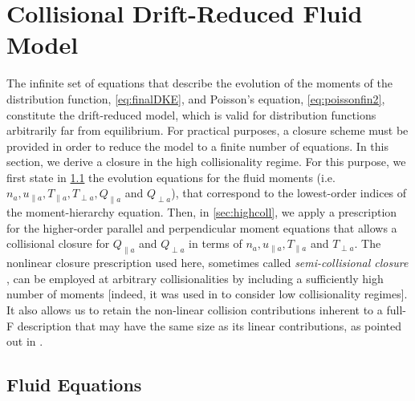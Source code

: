 {{\section{Collisional Drift-Reduced Fluid Model}
\label{sec:fluidmodel}

The infinite set of equations that describe the evolution of the moments of the distribution function, \cref{eq:finalDKE}, and Poisson's equation, \cref{eq:poissonfin2}, constitute the drift-reduced model, which is valid for distribution functions arbitrarily far from equilibrium. For practical purposes, a closure scheme must be provided in order to reduce the model to a finite number of equations.
In this section, we derive a closure in the high collisionality regime. For this purpose, we first state in \cref{sec:fluideqs} the evolution equations for the fluid moments (i.e. $n_a, u_{\parallel a}, T_{\parallel a}, T_{\perp a}, Q_{\parallel a}$ and $Q_{\perp a}$), that correspond to the lowest-order indices of the moment-hierarchy equation. Then, in \cref{sec:highcoll}, we apply a prescription for the higher-order parallel and perpendicular moment equations that allows a collisional closure for $Q_{\parallel a}$ and $Q_{\perp a}$ in terms of $n_a, u_{\parallel a}, T_{\parallel a}$ and $T_{\perp a}$.
The nonlinear closure prescription used here, {sometimes called \textit{semi-collisional closure} \citep{Zocco2011}}, can be employed at arbitrary collisionalities by including a sufficiently high number of moments {[indeed, it was used in \citet{Zocco2015,Loureiro2015} to consider low collisionality regimes]. It also allows us to retain the non-linear collision contributions inherent to a full-F description that may have the same size as its linear contributions, as pointed out in \citet{Catto2004}.}

\subsection{Fluid Equations}
\label{sec:fluideqs}

}}
